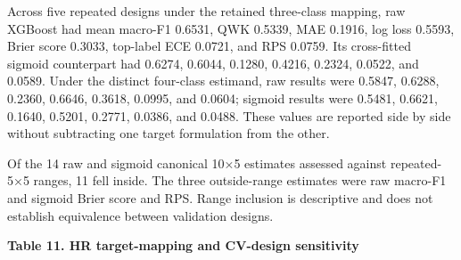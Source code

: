 \documentclass[
  a4paper,
  review]{elsarticle}
\begin{document}
Across five repeated designs under the retained three-class mapping, raw
XGBoost had mean macro-F1 0.6531, QWK 0.5339, MAE 0.1916, log loss
0.5593, Brier score 0.3033, top-label ECE 0.0721, and RPS 0.0759. Its
cross-fitted sigmoid counterpart had 0.6274, 0.6044, 0.1280, 0.4216,
0.2324, 0.0522, and 0.0589. Under the distinct four-class estimand, raw
results were 0.5847, 0.6288, 0.2360, 0.6646, 0.3618, 0.0995, and 0.0604;
sigmoid results were 0.5481, 0.6621, 0.1640, 0.5201, 0.2771, 0.0386, and
0.0488. These values are reported side by side without subtracting one
target formulation from the other.

Of the 14 raw and sigmoid canonical 10×5 estimates assessed against
repeated-5×5 ranges, 11 fell inside. The three outside-range estimates
were raw macro-F1 and sigmoid Brier score and RPS. Range inclusion is
descriptive and does not establish equivalence between validation
designs.

\textbf{Table 11. HR target-mapping and CV-design sensitivity}
\end{document}
